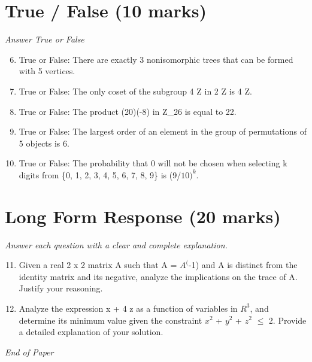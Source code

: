 \documentclass[12pt]{article}
\begin{document}
\section*{True / False (10 marks)}
\textit{Answer True or False}
\begin{enumerate}[label=\arabic*.]
\setcounter{enumi}{5}
\item True or False: There are exactly 3 nonisomorphic trees that can be formed with 5 vertices.
\item True or False: The only coset of the subgroup 4 Z in 2 Z is 4 Z.
\item True or False: The product (20)(-8) in Z\_26 is equal to 22.
\item True or False: The largest order of an element in the group of permutations of 5 objects is 6.
\item True or False: The probability that 0 will not be chosen when selecting k digits from \{0, 1, 2, 3, 4, 5, 6, 7, 8, 9\} is (9/$10)^k$.
\end{enumerate}

\section*{Long Form Response (20 marks)}
\textit{Answer each question with a clear and complete explanation.}
\begin{enumerate}[label=\arabic*.]
\setcounter{enumi}{10}
\item Given a real 2 x 2 matrix A such that A = $A^($-1) and A is distinct from the identity matrix and its negative, analyze the implications on the trace of A. Justify your reasoning.
\item Analyze the expression x + 4 z as a function of variables in $R^3$, and determine its minimum value given the constraint $x^2$ + $y^2$ + $z^2$ \ensuremath{\leq} 2. Provide a detailed explanation of your solution.
\end{enumerate}

\vfill
\noindent\textit{End of Paper}
\end{document}
